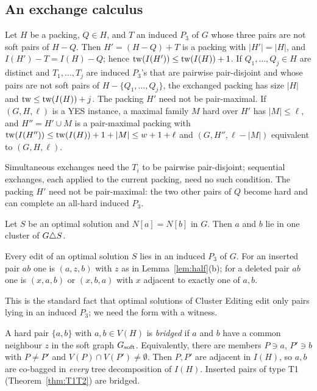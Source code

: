\subsection{An exchange calculus}
\begin{lemma}[Exchange]\label{lem:rpex}
Let $H$ be a packing, $Q\in H$, and $T$ an induced $P_3$ of $G$ whose three pairs are not soft pairs of $H-Q$. Then $H'=(H-Q)+T$ is a packing with $|H'|=|H|$, and $I(H')-T=I(H)-Q$; hence $\mathrm{tw}(I(H'))\le\mathrm{tw}(I(H))+1$. If $Q_1,\dots,Q_j\in H$ are distinct and $T_1,\dots,T_j$ are induced $P_3$'s that are pairwise pair-disjoint and whose pairs are not soft pairs of $H-\{Q_1,\dots,Q_j\}$, the exchanged packing has size $|H|$ and $\mathrm{tw}\le\mathrm{tw}(I(H))+j$. The packing $H'$ need not be pair-maximal. If $(G,H,\ell)$ is a YES instance, a maximal family $M$ hard over $H'$ has $|M|\le\ell$, and $H''=H'\cup M$ is a pair-maximal packing with $\mathrm{tw}(I(H''))\le\mathrm{tw}(I(H))+1+|M|\le w+1+\ell$ and $(G,H'',\ell-|M|)$ equivalent to $(G,H,\ell)$.
\end{lemma}
Simultaneous exchanges need the $T_i$ to be pairwise pair-disjoint; sequential exchanges, each applied to the current packing, need no such condition. The packing $H'$ need not be pair-maximal: the two other pairs of $Q$ become hard and can complete an all-hard induced $P_3$.

\begin{lemma}\label{lem:rptwin}
Let $S$ be an optimal solution and $N[a]=N[b]$ in $G$. Then $a$ and $b$ lie in one cluster of $G\triangle S$.
\end{lemma}
\begin{corollary}\label{cor:rpP3}
Every edit of an optimal solution $S$ lies in an induced $P_3$ of $G$. For an inserted pair $ab$ one is $(a,z,b)$ with $z$ as in Lemma~\ref{lem:half}(b); for a deleted pair $ab$ one is $(x,a,b)$ or $(x,b,a)$ with $x$ adjacent to exactly one of $a,b$.
\end{corollary}
This is the standard fact that optimal solutions of Cluster Editing edit only pairs lying in an induced $P_3$; we need the form with a witness.

\begin{definition}\label{def:rpbridge}
A hard pair $\{a,b\}$ with $a,b\in V(H)$ is \emph{bridged} if $a$ and $b$ have a common neighbour $z$ in the soft graph $G_{\mathrm{soft}}$. Equivalently, there are members $P\ni a$, $P'\ni b$ with $P\neq P'$ and $V(P)\cap V(P')\neq\emptyset$. Then $P,P'$ are adjacent in $I(H)$, so $a,b$ are co-bagged in \emph{every} tree decomposition of $I(H)$. Inserted pairs of type T1 (Theorem~\ref{thm:T1T2}) are bridged.
\end{definition}

